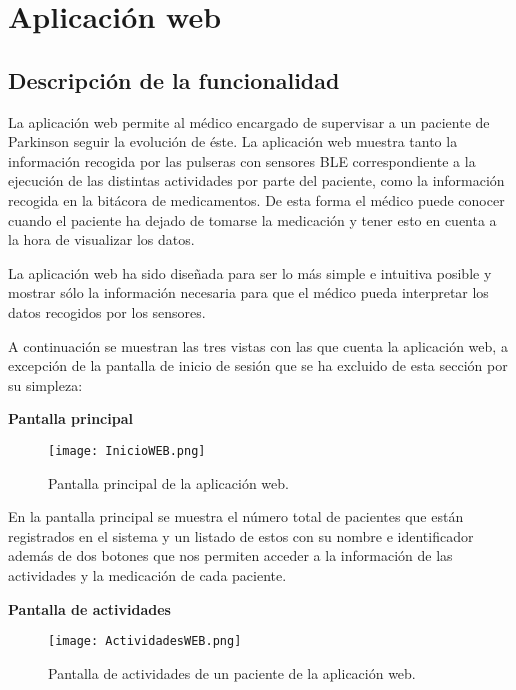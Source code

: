 \documentclass[11pt,spanish]{article}
\begin{document}
\section{Aplicación web}
\subsection{Descripción de la funcionalidad}
La aplicación web permite al médico encargado de supervisar a un paciente de Parkinson seguir la evolución de éste. La aplicación web muestra tanto la información recogida por las pulseras con sensores BLE correspondiente a la ejecución de las distintas actividades por parte del paciente, como la información recogida en la bitácora de medicamentos. De esta forma el médico puede conocer cuando el paciente ha dejado de tomarse la medicación y tener esto en cuenta a la hora de visualizar los datos.
\newline

La aplicación web ha sido diseñada para ser lo más simple e intuitiva posible y mostrar sólo la información necesaria para que el médico pueda interpretar los datos recogidos por los sensores.
\newline

A continuación se muestran las tres vistas con las que cuenta la aplicación web, a excepción de la pantalla de inicio de sesión que se ha excluido de esta sección por su simpleza:
\newline

\textbf{Pantalla principal}
\newline

\begin{figure}[H]
  \centering
  \texttt{[image: InicioWEB.png]}
  \caption{Pantalla principal de la aplicación web.}
\end{figure}

En la pantalla principal se muestra el número total de pacientes que están registrados en el sistema y un listado de estos con su nombre e identificador además de dos botones que nos permiten acceder a la información de las actividades y la medicación de cada paciente.
\newline
\newline

\textbf{Pantalla de actividades}
\newline

\begin{figure}[H]
  \centering
  \texttt{[image: ActividadesWEB.png]}
  \caption{Pantalla de actividades de un paciente de la aplicación web.}
\end{figure}
\end{document}
